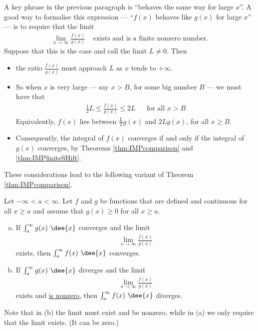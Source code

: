 A key phrase in the previous paragraph is ``behaves the same way for large
$x$''. A good way to formalise this expression --- ``$f(x)$ behaves like $g(x)$
for large $x$'' --- is to require that the limit
\begin{align*}
\lim_{x\rightarrow\infty}\frac{f(x)}{g(x)} & \text{ exists and is a finite
nonzero number.}
\end{align*}
Suppose that this is the case and call the limit $L\ne 0$. Then
\begin{itemize}
 \item the ratio $\frac{f(x)}{g(x)}$ must approach $L$ as $x$
tends to $+\infty$.
\item So when $x$ is very large --- say $x>B$, for some
big number $B$ --- we must have that
\begin{align*}
  \frac{1}{2}L \leq \frac{f(x)}{g(x)} \leq 2L && \text{for all $x>B$}
\end{align*}
Equivalently, $f(x)$ lies between $\frac{L}{2}g(x)$ and $2Lg(x)$, for all
$x\ge B$.

\item Consequently, the integral of $f(x)$ converges if and only if the
integral of $g(x)$ converges, by Theorems \ref{thm:IMPcomparison} and
\ref{thm:IMPfiniteSHift}.
\end{itemize}
These considerations lead to the following variant of Theorem
\ref{thm:IMPcomparison}.

\begin{theorem}\label{thm:IMPcomparisonLim}
Let $-\infty<a<\infty$. Let $f$ and $g$ be functions that are defined
and continuous for all $x\ge a$ and assume that  $g(x)\ge 0$ for all
$x\ge a$.
\begin{enumerate}[(a)]
\item If  $\int_a^\infty g(x)\ \dee{x}$ converges and the limit
\begin{align*}
\lim_{x\rightarrow\infty}\frac{f(x)}{g(x)}
\end{align*}
exists, then $\int_a^\infty f(x)\ \dee{x}$ converges.
\item If $\int_a^\infty g(x)\ \dee{x}$  diverges and the limit
\begin{align*}
\lim_{x\rightarrow\infty}\frac{f(x)}{g(x)}
\end{align*}
exists and \underline{is nonzero}, then $\int_a^\infty f(x)\ \dee{x}$ diverges.
\end{enumerate}
Note that in (b) the limit must exist and be nonzero, while in (a) we only
require that the limit exists. (It can be zero.)
\end{theorem}

